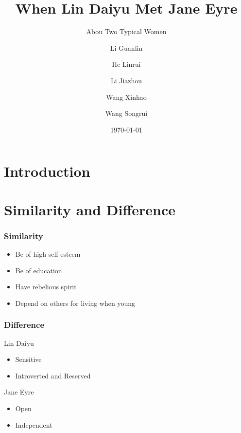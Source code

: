 \documentclass{beamer}
\title[About Women]
{When Lin Daiyu Met Jane Eyre}
\subtitle{Abou Two Typical Women}
\author[] %
{Li Guanlin\inst{1} \and He Linrui\inst{1} \and Li Jiazhou \inst{1} \and Wang Xinhao \inst{1} \and Wang Songrui \inst{1}}
\institute[NJU] %
{
\inst{1}%
Undergraduates of ICS\\
Nanjing University
}
\date[NJU 2023] %
{\today}
\begin{document}
\begin{frame}
    \titlepage
    \begin{figure}[htpb]
    \end{figure}
\end{frame}

\begin{frame}
    \tableofcontents[sectionstyle=show,subsectionstyle=show/shaded/hide,subsubsectionstyle=show/shaded/hide]
\end{frame}

\section{Introduction}

\section{Similarity and Difference}

\begin{frame}
    \frametitle{Similarity}
    \Large
    \begin{itemize}[<+->]
        \item Be of high self-esteem
        \item Be of education
        \item Have rebelious spirit
        \item Depend on others for living when young
    \end{itemize}
\end{frame}

\begin{frame}
    \frametitle{Difference}
    \Large
    \begin{block}{Lin Daiyu}
        \begin{itemize}
            \item Sensitive
            \item Introverted and Reserved
        \end{itemize}        
    \end{block}
    \begin{block}{Jane Eyre}
        \begin{itemize}
            \item Open 
            \item Independent
        \end{itemize}
    \end{block}
\end{frame}
\end{document}
